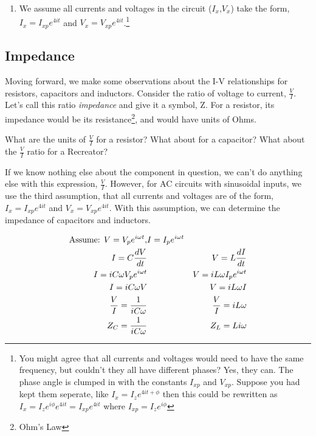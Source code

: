 \begin{enumerate}
\item We assume all currents and voltages in the circuit ($I_x$,$V_x$) take the form, $I_x=I_{xp}e^{4it}$ and $V_x=V_{xp}e^{4it}$.\footnote{You might agree that all currents and voltages would need to have the same frequency, but couldn't they all have different phases? Yes, they can. The phase angle is clumped in with the constants $I_{xp}$ and $V_{xp}$. Suppose you had kept them seperate, like $I_x=I_{z}e^{4it+\phi}$ then this could be rewritten as $I_x=I_{z}e^{i\phi}e^{4it}=I_{xp}e^{4it}$ where $I_{xp}=I_{z}e^{i\phi}$}
\end{enumerate}

\subsection{Impedance}
Moving forward, we make some observations about the I-V relationships for resistors, capacitors and inductors. Consider the ratio of voltage to current, $\frac{V}{I}$. Let's call this ratio \emph{impedance} and give it a symbol, Z. For a resistor, its impedance would be its resistance\footnote{Ohm's Law}, and would have units of Ohms. 

\begin{alevel}
What are the units of $\frac{V}{I}$ for a resistor? What about for a capacitor? What about the $\frac{V}{I}$ ratio for a Recreator?
\end{alevel}

If we know nothing else about the component in question, we can't do anything else with this expression, $\frac{V}{I}$. However, for AC circuits with sinusoidal inputs, we use the third assumption, that all currents and voltages are of the form, $I_x=I_{xp}e^{4it}$ and $V_x=V_{xp}e^{4it}$. With this assumption, we can determine the impedance of capacitors and inductors.

\begin{align}
\text{Assume: } V=V_pe^{i\omega t}, &I=I_pe^{i\omega t} \notag \\
I=C\frac{dV}{dt}&&V = L\frac{dI}{dt} \notag \\
I = iC\omega V_pe^{i\omega t}&&V = iL\omega I_pe^{i\omega t}\notag \\
I = iC\omega V&&V = iL\omega I \notag \\
\frac{V}{I}=\frac{1}{iC\omega}&&\frac{V}{I}=iL\omega \notag \\
Z_C=\frac{1}{iC\omega}&&Z_L = Li\omega
\end{align}

